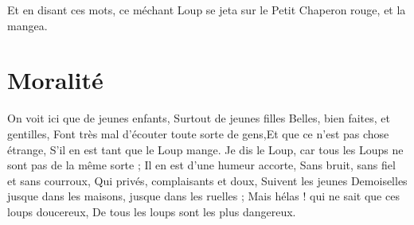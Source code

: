 \documentclass[a4paper,11pt]{article}
\begin{document}
\bigskip
{}

\bigskip
\noindent Et en disant ces mots, ce méchant Loup se jeta sur le Petit Chaperon rouge, et la mangea.

\section{Moralité}\label{moralite}
On voit ici que de jeunes enfants, Surtout de jeunes filles Belles, bien faites, et gentilles, Font très mal d'écouter toute sorte de gens,\hspace{5cm}Et que ce n'est pas chose étrange, S'il en est tant que le Loup mange.
Je dis le Loup, car tous les Loups ne sont pas de la même sorte ; Il en est d'une humeur accorte, Sans bruit, sans fiel et sans courroux, Qui privés, complaisants et doux, Suivent les jeunes Demoiselles jusque dans les maisons, jusque dans les ruelles ; Mais hélas ! qui ne sait que ces loups doucereux, De tous les loups sont les plus dangereux.
\end{document}
